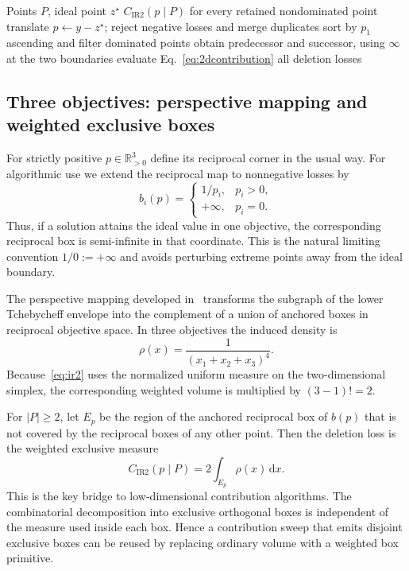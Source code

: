 \documentclass[runningheads]{llncs}
\newcommand{\IR}{\operatorname{IR2}}
\newcommand{\R}{\mathbb{R}}
\newcommand{\cIR}{C_{\IR}}
\begin{document}
\begin{algorithm}[t]
\caption{All Integral R2 deletion losses in two objectives}
\label{alg:all2d}
\begin{algorithmic}[1]
\Require Points $P$, ideal point $z^\star$
\Ensure $\cIR(p\mid P)$ for every retained nondominated point
\State translate $p\gets y-z^\star$; reject negative losses and merge duplicates
\State sort by $p_1$ ascending and filter dominated points
    \State obtain predecessor and successor, using $\infty$ at the two boundaries
    \State evaluate Eq.~\eqref{eq:2dcontribution}
\EndFor
\State \Return all deletion losses
\end{algorithmic}
\end{algorithm}

\subsection{Three objectives: perspective mapping and weighted exclusive boxes}
\label{subsec:3d}

For strictly positive $p\in\R^3_{>0}$ define its reciprocal corner in the usual way. For algorithmic use we extend the reciprocal map to nonnegative losses by
\begin{equation}
\label{eq:extended-reciprocal}
    b_i(p)=
    \begin{cases}
      1/p_i, & p_i>0,\\
      +\infty, & p_i=0.
    \end{cases}
\end{equation}
Thus, if a solution attains the ideal value in one objective, the corresponding reciprocal box is semi-infinite in that coordinate. This is the natural limiting convention $1/0:=+\infty$ and avoids perturbing extreme points away from the ideal boundary.

The perspective mapping developed in~\cite{Emmerich2026Perspective} transforms the subgraph of the lower Tchebycheff envelope into the complement of a union of anchored boxes in reciprocal objective space. In three objectives the induced density is
\begin{equation}
\label{eq:density}
    \rho(x)=\frac{1}{(x_1+x_2+x_3)^4}.
\end{equation}
Because~\eqref{eq:ir2} uses the normalized uniform measure on the two-dimensional simplex, the corresponding weighted volume is multiplied by $(3-1)!=2$.

For $|P|\ge2$, let $E_p$ be the region of the anchored reciprocal box of $b(p)$ that is not covered by the reciprocal boxes of any other point. Then the deletion loss is the weighted exclusive measure
\begin{equation}
\label{eq:weighted-exclusive}
    \cIR(p\mid P)=2\int_{E_p}\rho(x)\,\mathrm{d}x.
\end{equation}
This is the key bridge to low-dimensional contribution algorithms. The combinatorial decomposition into exclusive orthogonal boxes is independent of the measure used inside each box. Hence a contribution sweep that emits disjoint exclusive boxes can be reused by replacing ordinary volume with a weighted box primitive.
\end{document}

